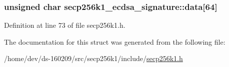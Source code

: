 \subsubsection[{data}]{\setlength{\rightskip}{0pt plus 5cm}unsigned char secp256k1\+\_\+ecdsa\+\_\+signature\+::data\mbox{[}64\mbox{]}}\label{structsecp256k1__ecdsa__signature_a80f750e6d473a8d43c77e53757893f15}


Definition at line 73 of file secp256k1.\+h.



The documentation for this struct was generated from the following file\+:\begin{DoxyCompactItemize}
\item 
/home/dev/ds-\/160209/src/secp256k1/include/\hyperlink{secp256k1_8h}{secp256k1.\+h}\end{DoxyCompactItemize}
